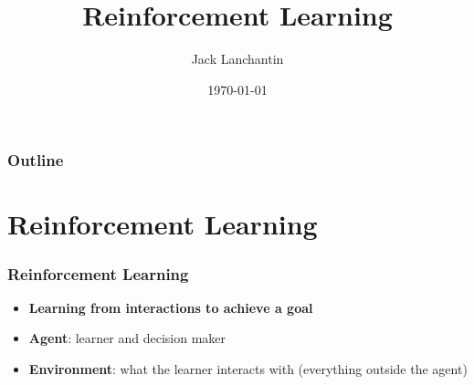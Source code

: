 \documentclass{beamer}
\title[Reinforcement Learning]{Reinforcement Learning} %
\author{Jack Lanchantin} %
\date{\today} %
\begin{document}
\begin{frame}
\titlepage %

\end{frame}

\begin{frame}
\frametitle{Outline} %
\tableofcontents %
\end{frame}

\section{Reinforcement Learning} %

\begin{frame}
\frametitle{Reinforcement Learning}
\begin{itemize}
\item \textbf{Learning from interactions to achieve a goal}
\item \textbf{Agent}: learner and decision maker
\item \textbf{Environment}: what the learner interacts with (everything outside the agent)
\end{itemize}
\end{frame}

\end{document}
